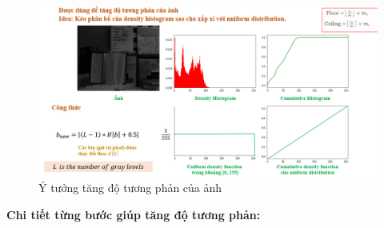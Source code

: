 \documentclass[11pt]{article}
\begin{document}
\vspace{0.2cm}
\begin{figure}[H]
    \centering
    \includegraphics[width=0.8\linewidth]{images/he_idea.png} %
    \caption{Ý tưởng tăng độ tương phản của ảnh}
\end{figure}

\noindent\textbf{Chi tiết từng bước giúp tăng độ tương phản:}
\end{document}
